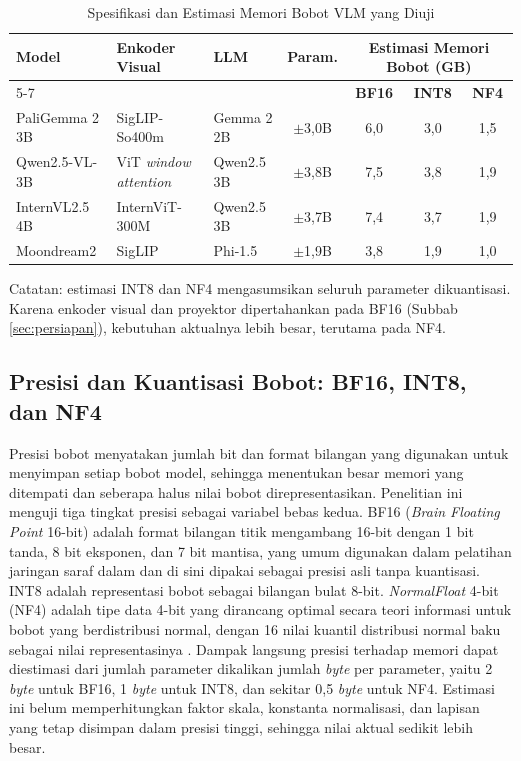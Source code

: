 \begin{table}[htbp]
    \centering
    \caption{Spesifikasi dan Estimasi Memori Bobot VLM yang Diuji}
    \label{tab:model}
    \renewcommand{\arraystretch}{1.3}
    \small
    \begin{tabular}{|p{2.6cm}|p{2.4cm}|p{2.2cm}|c|c|c|c|}
    \hline
    \multirow{2}{*}{\textbf{Model}} & \multirow{2}{*}{\textbf{Enkoder Visual}} & \multirow{2}{*}{\textbf{LLM}} & \multirow{2}{*}{\textbf{Param.}} & \multicolumn{3}{c|}{\textbf{Estimasi Memori Bobot (GB)}} \\
    \cline{5-7}
    & & & & \textbf{BF16} & \textbf{INT8} & \textbf{NF4} \\
    \hline
    PaliGemma 2 3B & SigLIP-So400m & Gemma 2 2B & $\pm$3,0B & 6,0 & 3,0 & 1,5 \\
    \hline
    Qwen2.5-VL-3B & ViT \textit{window attention} & Qwen2.5 3B & $\pm$3,8B & 7,5 & 3,8 & 1,9 \\
    \hline
    InternVL2.5 4B \cite{ref29} & InternViT-300M & Qwen2.5 3B & $\pm$3,7B & 7,4 & 3,7 & 1,9 \\
    \hline
    Moondream2 & SigLIP & Phi-1.5 & $\pm$1,9B & 3,8 & 1,9 & 1,0 \\
    \hline
    \end{tabular}

    \vspace{1ex}
    {\footnotesize Catatan: estimasi INT8 dan NF4 mengasumsikan seluruh parameter dikuantisasi. Karena enkoder visual dan proyektor dipertahankan pada BF16 (Subbab \ref{sec:persiapan}), kebutuhan aktualnya lebih besar, terutama pada NF4.\par}
\end{table}

\subsection{Presisi dan Kuantisasi Bobot: BF16, INT8, dan NF4}
\label{sub:kuantisasi}
Presisi bobot menyatakan jumlah bit dan format bilangan yang digunakan untuk menyimpan setiap bobot model, sehingga menentukan besar memori yang ditempati dan seberapa halus nilai bobot direpresentasikan. Penelitian ini menguji tiga tingkat presisi sebagai variabel bebas kedua. BF16 (\textit{Brain Floating Point} 16-bit) adalah format bilangan titik mengambang 16-bit dengan 1 bit tanda, 8 bit eksponen, dan 7 bit mantisa, yang umum digunakan dalam pelatihan jaringan saraf dalam dan di sini dipakai sebagai presisi asli tanpa kuantisasi. INT8 adalah representasi bobot sebagai bilangan bulat 8-bit. \textit{NormalFloat} 4-bit (NF4) adalah tipe data 4-bit yang dirancang optimal secara teori informasi untuk bobot yang berdistribusi normal, dengan 16 nilai kuantil distribusi normal baku sebagai nilai representasinya \cite{ref35}. Dampak langsung presisi terhadap memori dapat diestimasi dari jumlah parameter dikalikan jumlah \textit{byte} per parameter, yaitu 2 \textit{byte} untuk BF16, 1 \textit{byte} untuk INT8, dan sekitar 0,5 \textit{byte} untuk NF4. Estimasi ini belum memperhitungkan faktor skala, konstanta normalisasi, dan lapisan yang tetap disimpan dalam presisi tinggi, sehingga nilai aktual sedikit lebih besar.

